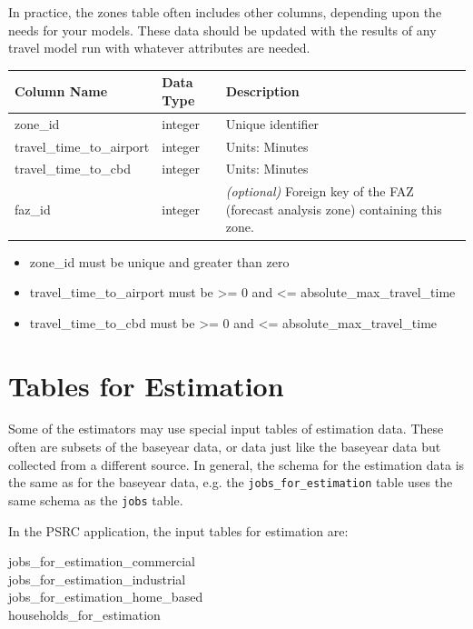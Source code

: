 In practice, the zones table often includes other columns, depending upon the
needs for your models.  These data should be updated with the results of any
travel model \modelsindex run with whatever attributes are needed.

\begin{tabular}{|l|l|p{3.5in}|}
\hline
\textbf{Column Name} & \textbf{Data Type} & \textbf{Description} \\
\hline zone_id & integer & Unique identifier  \\

\hline travel_time_to_airport & integer & Units: Minutes  \\

\hline travel_time_to_cbd & integer & Units: Minutes  \\

\hline faz_id & integer & \emph{(optional) } Foreign key of the FAZ (forecast
analysis zone) containing this zone.   \\

\hline
\end{tabular}

\begin{itemize} \tight
\item zone_id must be unique and greater than zero
\item travel_time_to_airport must be \textgreater{}= 0 and \textless{}= absolute_max_travel_time
\item travel_time_to_cbd must be \textgreater{}= 0 and \textless{}= absolute_max_travel_time

\end{itemize}

\section{Tables for Estimation}

Some of the estimators may use special input tables of estimation data.  These
often are subsets of the baseyear data, or data just like the baseyear data but
collected from a different source.  In general, the schema for the estimation
data is the same as for the baseyear data, e.g. the \verb|jobs_for_estimation|
table uses the same schema as the \verb|jobs| table.

In the PSRC \psrcindex application, the input tables for estimation are:

\begin{description}
\item[jobs_for_estimation_commercial]
\item[jobs_for_estimation_industrial]
\item[jobs_for_estimation_home_based]
\item[households_for_estimation]
\end{description}


